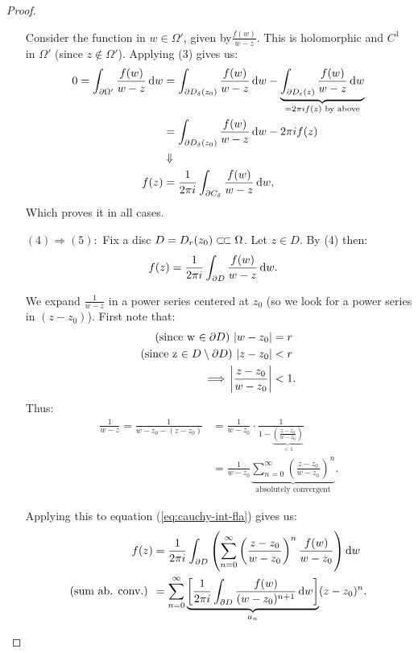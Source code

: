\begin{proof}
\begin{enumerate}
\begin{center}
    \end{center}
    
    Consider the function in $w\in\Omega'$, given by$\frac{f(w)}{w-z}$. This is holomorphic and $C^1$ in $\Omega'$ (since $z \notin \Omega'$). Applying (3) gives us:
    \begin{align*}
        0 = \int_{\partial \Omega'} \frac{f(w)}{w-z}  \dif w &= \int_{\partial D_\delta (z_0)} \frac{f(w)}{w-z}  \dif w - \underbrace{\int_{\partial D_\epsilon (z)} \frac{f(w)}{w-z}  \dif w}_{=2\pi i f(z) \text{ by above}}\\
        &= \int_{\partial D_\delta (z_0)} \frac{f(w)}{w-z}  \dif w - 2\pi i f(z)\\
        &\Downarrow\\
        f(z) &= \frac{1}{2\pi i}\int_{\partial C_\delta} \frac{f(w)}{w-z} \dif w,
    \end{align*}
    Which proves it in all cases.
    
    
\item[$(4) \Rightarrow (5):$] Fix a disc $D= D_r(z_0) \ssubset \Omega$. Let $z\in D$. By (4) then:
\begin{align*}
    f(z) &= \frac{1}{2\pi i} \int_{\partial D} \frac{f(w)}{w-z}  \dif w.
\end{align*}
    
We expand $\frac{1}{w-z}$ in a power series centered at $z_0$ (so we look for a power series in $(z-z_0)$). First note that:
\begin{align*}
    \text{(since w $\in \partial D$)  } \abs{w-z_0} &= r\\
    \text{(since z $\in D \setminus \partial D$)  } \abs{z-z_0} &< r\\
    \implies \abs{\frac{z-z_0}{w-z_0}} &< 1.
\end{align*}
Thus:
\begin{align*} 
    \frac{1}{w-z} = \frac{1}{w-z_0-(z-z_0)} &= \frac{1}{w-z_0} \cdot \frac{1}{1-   \underbrace{ \left( \frac{z-z_0}{w-z_0} \right)   }_{<1}}\\
    &= \frac{1}{w-z_0} \underbrace{ \sum_{n=0}^\infty \left( \frac{z-z_0}{w-z_0} \right)^n }_{\text{absolutely convergent}}.
\end{align*}
    
Applying this to equation (\ref{eq:cauchy-int-fla}) gives us:
\begin{align*}
     f(z) &= \frac{1}{2\pi i} \int_{\partial D} \left( \sum_{n=0}^\infty \left( \frac{z-z_0}{w-z_0} \right)^n \frac{f(w)}{w-z_0} \right) \dif w\\
     \text{(sum ab. conv.) } &= \sum_{n=0}^\infty \underbrace{ \left[  \frac{1}{2\pi i} \int_{\partial D}  \frac{f(w)}{(w-z_0)^{n+1}} \dif w  \right] }_{a_n} (z-z_0)^n.
\end{align*}
    

\end{enumerate}
\end{proof}

